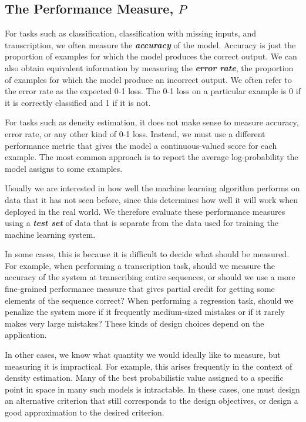 \documentclass{report}
\begin{document}
\subsection{The Performance Measure, $P$}
\noindent For tasks such as classification, classification with missing inputs, and transcription, we often measure the \textbf{\textit{accuracy}} of the model. Accuracy is just the proportion of examples for which the model produces the correct output. We can also obtain equivalent information by measuring the \textbf{\textit{error rate}}, the proportion of examples for which the model produce an incorrect output. We often refer to the error rate as the expected 0-1 loss. The 0-1 loss on a particular example is 0 if it is correctly classified and 1 if it is not. \newline

\noindent For tasks such as density estimation, it does not make sense to measure accuracy, error rate, or any other kind of 0-1 loss. Instead, we must use a different performance metric that gives the model a continuous-valued score for each example. The most common approach is to report the average log-probability the model assigns to some examples.\newline

\noindent Usually we are interested in how well the machine learning algorithm performs on data that it has not seen before, since this determines how well it will work when deployed in the real world. We therefore evaluate these performance measures using a \textbf{\textit{test set}} of data that is separate from the data used for training the machine learning system.\newline

\noindent In some cases, this is because it is difficult to decide what should be measured. For example, when performing a transcription task, should we measure the accuracy of the system at transcribing entire sequences, or should we use a more fine-grained performance measure that gives partial credit for getting some elements of the sequence correct? When performing a regression task, should we penalize the system more if it frequently medium-sized mistakes or if it rarely makes very large mistakes? These kinds of design choices depend on the application.\newline

\noindent In other cases, we know what quantity we would ideally like to measure, but measuring it is impractical. For example, this arises frequently in the context of density estimation. Many of the best probabilistic value assigned to a specific point in space in many such models is intractable. In these cases, one must design an alternative criterion that still corresponds to the design objectives, or design a good approximation to the desired criterion.\newline
\end{document}
